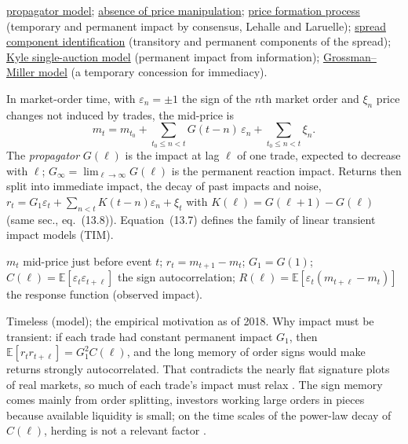 \begin{qfdefinition}
 \hyperref[mod:propagator]{propagator model}; \hyperref[res:no-price-manipulation]{absence of price manipulation}; \hyperref[def:price-formation-process]{price formation process} (temporary and permanent impact by consensus, Lehalle and Laruelle); \hyperref[res:spread-component-identification]{spread component identification} (transitory and permanent components of the spread); \hyperref[mod:kyle-single-auction]{Kyle single-auction model} (permanent impact from information); \hyperref[mod:grossman-miller]{Grossman--Miller model} (a temporary concession for immediacy).

\end{qfdefinition}

\begin{qfmodel}\label{mod:propagator}
 In market-order time, with $\varepsilon_n=\pm1$ the sign of the $n$th market order and $\xi_n$ price changes not induced by trades, the mid-price is \citep[chap.~13, sec.~13.2, eq.~(13.7), p.~252]{catalogue-0528}
\[ m_t=m_{t_0}+\sum_{t_0\le n<t}G(t-n)\,\varepsilon_n+\sum_{t_0\le n<t}\xi_n. \]
The \emph{propagator} $G(\ell)$ is the impact at lag $\ell$ of one trade, expected to decrease with $\ell$; $G_\infty=\lim_{\ell\to\infty}G(\ell)$ is the permanent reaction impact. Returns then split into immediate impact, the decay of past impacts and noise, $r_t=G_1\varepsilon_t+\sum_{n<t}K(t-n)\varepsilon_n+\xi_t$ with $K(\ell)=G(\ell+1)-G(\ell)$ (same sec., eq.~(13.8)). Equation~(13.7) defines the family of linear transient impact models (TIM).

 $m_t$ mid-price just before event $t$; $r_t=m_{t+1}-m_t$; $G_1=G(1)$; $C(\ell)=\mathbb E[\varepsilon_t\varepsilon_{t+\ell}]$ the sign autocorrelation; $R(\ell)=\mathbb E[\varepsilon_t(m_{t+\ell}-m_t)]$ the response function (observed impact).

 Timeless (model); the empirical motivation as of 2018. Why impact must be transient: if each trade had constant permanent impact $G_1$, then $\mathbb E[r_tr_{t+\ell}]=G_1^2C(\ell)$, and the long memory of order signs would make returns strongly autocorrelated. That contradicts the nearly flat signature plots of real markets, so much of each trade's impact must relax \citep[chap.~13, secs.~13.1--13.2, pp.~249--251]{catalogue-0528}. The sign memory comes mainly from order splitting, investors working large orders in pieces because available liquidity is small; on the time scales of the power-law decay of $C(\ell)$, herding is not a relevant factor \citep[chap.~10, secs.~10.4--10.5, p.~198]{catalogue-0528}.


\end{qfmodel}
